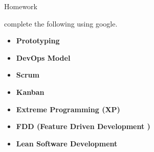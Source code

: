 \documentclass[a4paper]{article}
\begin{document}
\vspace{0.5 cm}

\begin{Large}Homework\end{Large}
    
complete the following using google.
\begin{itemize}
    \item \textbf{Prototyping}
    \item \textbf{DevOps Model}
    \item \textbf{Scrum }
    \item \textbf{Kanban}
    \item \textbf{Extreme Programming (XP)}
    \item \textbf{FDD (Feature Driven Development )}
    \item \textbf{Lean Software Development}
\end{itemize}
\end{document}
